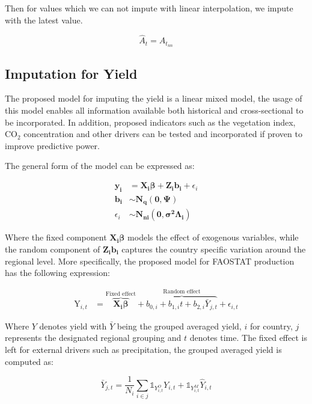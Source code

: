 \documentclass[nojss]{jss}\usepackage[]{graphicx}\usepackage[]{color}
\begin{document}
Then for values which we can not impute with linear interpolation, we
impute with the latest value.

\begin{equation}
  \label{eq:locf}
  \hat{A}_t = A_{t_{nn}}
\end{equation}



\subsection{Imputation for Yield}
The proposed model for imputing the yield is a linear mixed model, the
usage of this model enables all information available both
historical and cross-sectional to be incorporated. In addition,
proposed indicators such as the vegetation index, $\text{CO}_2$
concentration and other drivers can be tested and incorporated if
proven to improve predictive power.

The general form of the model can be expressed as:

\begin{align}
  \mathbf{y_i} &= \mathbf{X_i}\boldsymbol{\beta} +
  \mathbf{Z_i}\mathbf{b_i} + \epsilon_i \nonumber\\
  \mathbf{b_i} &\sim \mathbf{N_q}(\mathbf{0}, \boldsymbol{\Psi})\nonumber\\
  \epsilon_i &\sim \mathbf{N_{ni}}(\mathbf{0},
  \boldsymbol{\sigma^2}\boldsymbol{\Lambda_i})
\end{align}

Where the fixed component $\mathbf{X_i}\boldsymbol{\beta}$ models the
effect of exogenous variables, while the random component of
$\mathbf{Z_i}\mathbf{b_i}$ captures the country specific variation
around the regional level.  More specifically, the proposed model for
FAOSTAT production has the following expression:

\begin{align}
  \label{eq:lmeImpute}
  \text{Y}_{i,t} &= \overbrace{\mathbf{X_i}\boldsymbol{\beta}}^{\text{Fixed effect}} +
  \overbrace{b_{0,i} + b_{1,i}t + b_{2,i}\bar{Y}_{j,t}}^{\text{Random effect}} +
  \epsilon_{i,t}
\end{align}

Where $Y$ denotes yield with $\bar{Y}$ being the grouped averaged
yield, $i$ for country, $j$ represents the designated regional
grouping and $t$ denotes time. The fixed effect is left for external
drivers such as precipitation, the grouped averaged yield is computed
as:

\begin{equation}
  \label{eq:averageYield}
  \bar{Y}_{j, t} = \frac{1}{N_i}\sum_{i \in j} \mathbb{1}_{Y^O_{i, t}
  }Y_{i, t} + \mathbb{1}_{Y^M_{i, t}}\hat{Y}_{i, t}
\end{equation}
\end{document}
